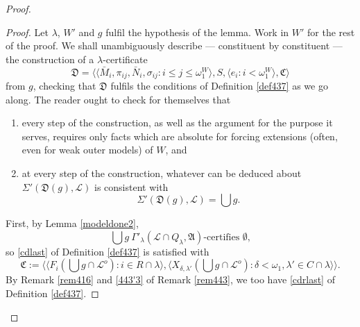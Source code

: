\documentclass[12pt, twoside]{memoir}
\numberwithin{equation}{section}
\theoremstyle{definition}
\theoremstyle{remark}
\theoremstyle{definition}
\theoremstyle{definition}
\theoremstyle{definition}
\theoremstyle{remark}
\begin{document}
\begin{proof}
\begin{proof}
Let $\lambda$, $W'$ and $g$ fulfil the hypothesis of the lemma. Work in $W'$ for the rest of the proof. We shall unambiguously describe --- constituent by constituent --- the construction of a $\lambda$-certificate
\begin{equation*}
    \mathfrak{D} = \langle \langle \bar{M}_i, \pi_{ij}, \bar{N}_i, \sigma_{ij} : i \leq j \leq \omega_1^{W} \rangle, S, \langle e_i : i < \omega_1^W \rangle, \mathfrak{C} \rangle
\end{equation*}
from $g$, checking that $\mathfrak{D}$ fulfils the conditions of Definition \ref{def437} as we go along. The reader ought to check for themselves that 
\begin{enumerate}[label=(\Roman*)]
    \item every step of the construction, as well as the argument for the purpose it serves, requires only facts which are absolute for forcing extensions (often, even for weak outer models) of $W$, and
    \item at every step of the construction, whatever can be deduced about $\Sigma'(\mathfrak{D}(g), \mathcal{L})$ is consistent with 
    \begin{equation*}
        \Sigma'(\mathfrak{D}(g), \mathcal{L}) = \bigcup g \text{.}
    \end{equation*}
\end{enumerate}

First, by Lemma \ref{modeldone2}, 
\begin{equation*}
    \bigcup g \ \Gamma'_{\lambda} (\mathcal{L} \cap Q_{\lambda}, \mathfrak{A}) \text{-certifies } \emptyset \text{,}
\end{equation*}
so \ref{cdlast} of Definition \ref{def437} is satisfied with
\begin{equation*}
    \mathfrak{C} := \langle \langle F_i(\bigcup g \cap \mathcal{L}^o) : i \in R \cap \lambda \rangle, \langle X_{\delta, \lambda'}(\bigcup g \cap \mathcal{L}^o) : \delta < \omega_1, \lambda' \in C \cap \lambda \rangle \rangle \text{.}
\end{equation*}
By Remark \ref{rem416} and \ref{443'3} of Remark \ref{rem443}, we too have \ref{cdrlast} of Definition \ref{def437}. 


\end{proof}
\end{proof}
\end{document}
